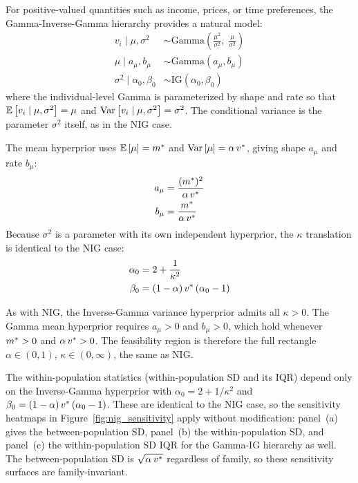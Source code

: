 For positive-valued quantities such as income, prices, or time
preferences, the Gamma-Inverse-Gamma hierarchy provides a natural model:
\begin{align}
  v_i \mid \mu, \sigma^2
    &\sim \text{Gamma}\!\left(
      \frac{\mu^2}{\sigma^2},\;
      \frac{\mu}{\sigma^2}
    \right) \\
  \mu \mid a_\mu, b_\mu &\sim \text{Gamma}(a_\mu, b_\mu) \\
  \sigma^2 \mid \alpha_0, \beta_0 &\sim \text{IG}(\alpha_0, \beta_0)
\end{align}
where the individual-level Gamma is parameterized by shape and rate so that
$\mathbb{E}\left[v_i \mid \mu, \sigma^2\right] = \mu$ and $\text{Var}\left[v_i \mid \mu, \sigma^2\right] =
\sigma^2$. The conditional variance is the parameter $\sigma^2$ itself, as in
the NIG case.

The mean hyperprior uses $\mathbb{E}\left[\mu\right] = m^*$ and $\text{Var}\left[\mu\right] = \alpha\,v^*$,
giving shape $a_\mu$ and rate $b_\mu$:
\begin{align}
  a_\mu &= \frac{(m^*)^2}{\alpha\,v^*} \\
  b_\mu &= \frac{m^*}{\alpha\,v^*}
\end{align}
Because $\sigma^2$ is a parameter with its own independent hyperprior, the
$\kappa$ translation is identical to the NIG case:
\begin{align}
  \alpha_0 &= 2 + \frac{1}{\kappa^2} \\
  \beta_0 &= (1 - \alpha)\,v^*\,(\alpha_0 - 1)
\end{align}

As with NIG, the Inverse-Gamma variance hyperprior admits all $\kappa > 0$.
The Gamma mean hyperprior requires $a_\mu > 0$ and $b_\mu > 0$, which hold
whenever $m^* > 0$ and $\alpha\,v^* > 0$. The feasibility region is therefore
the full rectangle $\alpha \in (0,1)$, $\kappa \in (0, \infty)$, the same as
NIG.

The within-population statistics (within-population SD and its IQR) depend only
on the Inverse-Gamma hyperprior with $\alpha_0 = 2 + 1/\kappa^2$ and $\beta_0
= (1-\alpha)\,v^*\,(\alpha_0 - 1)$. These are identical to the NIG case, so
the sensitivity heatmaps in Figure~\ref{fig:nig_sensitivity} apply without
modification: panel~(a) gives the between-population SD, panel~(b) the
within-population SD, and panel~(c) the within-population SD IQR for the
Gamma-IG hierarchy as well. The between-population SD is
$\sqrt{\alpha\,v^*}$ regardless of family, so these sensitivity surfaces are
family-invariant.

